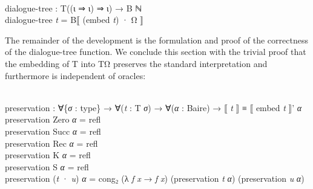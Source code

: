 \documentclass{entcs} \usepackage{prentcsmacro}
\newcommand{\AgdaFontStyle}[1]{\textsf{#1}}
\newcommand{\AgdaBoundFontStyle}[1]{\textit{#1}}
\newcommand{\AgdaSymbol}      [1]{\textcolor{AgdaSymbol}{#1}}
\newcommand{\AgdaBound}    [1]{\AgdaBoundFontStyle{\textcolor{AgdaBound}{#1}}}
\newcommand{\AgdaInductiveConstructor}[1]
    {\AgdaFontStyle{\textcolor{AgdaInductiveConstructor}{#1}}}
\newcommand{\AgdaDatatype} [1]{\AgdaFontStyle{\textcolor{AgdaDatatype}{#1}}}
\newcommand{\AgdaFunction} [1]{\AgdaFontStyle{\textcolor{AgdaFunction}{#1}}}
\newcommand{\AgdaCodeStyle}{\small}
\newenvironment{code}%
{\noindent\AgdaCodeStyle\pboxed}%
{\endpboxed\par\noindent%
\ignorespacesafterend}
\begin{document}
\begin{code}\>\<%
\\
\>\AgdaFunction{dialogue-tree} \AgdaSymbol{:} \AgdaDatatype{T}\AgdaSymbol{((}\AgdaInductiveConstructor{ι} \AgdaInductiveConstructor{⇒} \AgdaInductiveConstructor{ι}\AgdaSymbol{)} \AgdaInductiveConstructor{⇒} \AgdaInductiveConstructor{ι}\AgdaSymbol{)} \AgdaSymbol{→} \AgdaFunction{B} \AgdaDatatype{ℕ}\<%
\\
\>\AgdaFunction{dialogue-tree} \AgdaBound{t} \AgdaSymbol{=} \AgdaFunction{B⟦} \AgdaSymbol{(}\AgdaFunction{embed} \AgdaBound{t}\AgdaSymbol{)} \AgdaInductiveConstructor{·} \AgdaInductiveConstructor{Ω} \AgdaFunction{⟧}\<%
\\
\>\<\end{code}

\noindent
The remainder of the development is the formulation and proof of the
correctness of the dialogue-tree function.  We conclude this section
with the trivial proof that the embedding of T into TΩ preserves the
standard interpretation and furthermore is independent of oracles:

\begin{code}\>\<%
\\
\>\AgdaFunction{preservation} \AgdaSymbol{:} \AgdaSymbol{∀\{}\AgdaBound{σ} \AgdaSymbol{:} \AgdaDatatype{type}\AgdaSymbol{\}} \AgdaSymbol{→} \AgdaSymbol{∀(}\AgdaBound{t} \AgdaSymbol{:} \AgdaDatatype{T} \AgdaBound{σ}\AgdaSymbol{)} \AgdaSymbol{→} \AgdaSymbol{∀(}\AgdaBound{α} \AgdaSymbol{:} \AgdaFunction{Baire}\AgdaSymbol{)} \AgdaSymbol{→} \AgdaFunction{⟦} \AgdaBound{t} \AgdaFunction{⟧} \AgdaDatatype{≡} \AgdaFunction{⟦} \AgdaFunction{embed} \AgdaBound{t} \AgdaFunction{⟧'} \AgdaBound{α}\<%
\\
\>\AgdaFunction{preservation} \AgdaInductiveConstructor{Zero} \AgdaBound{α} \AgdaSymbol{=} \AgdaInductiveConstructor{refl}\<%
\\
\>\AgdaFunction{preservation} \AgdaInductiveConstructor{Succ} \AgdaBound{α} \AgdaSymbol{=} \AgdaInductiveConstructor{refl}\<%
\\
\>\AgdaFunction{preservation} \AgdaInductiveConstructor{Rec} \AgdaBound{α} \AgdaSymbol{=} \AgdaInductiveConstructor{refl}\<%
\\
\>\AgdaFunction{preservation} \AgdaInductiveConstructor{K} \AgdaBound{α} \AgdaSymbol{=} \AgdaInductiveConstructor{refl}\<%
\\
\>\AgdaFunction{preservation} \AgdaInductiveConstructor{S} \AgdaBound{α} \AgdaSymbol{=} \AgdaInductiveConstructor{refl}\<%
\\
\>\AgdaFunction{preservation} \AgdaSymbol{(}\AgdaBound{t} \AgdaInductiveConstructor{·} \AgdaBound{u}\AgdaSymbol{)} \AgdaBound{α} \AgdaSymbol{=} \AgdaFunction{cong₂} \AgdaSymbol{(λ} \AgdaBound{f} \AgdaBound{x} \AgdaSymbol{→} \AgdaBound{f} \AgdaBound{x}\AgdaSymbol{)} \AgdaSymbol{(}\AgdaFunction{preservation} \AgdaBound{t} \AgdaBound{α}\AgdaSymbol{)} \AgdaSymbol{(}\AgdaFunction{preservation} \AgdaBound{u} \AgdaBound{α}\AgdaSymbol{)}\<%
\\
\>\<\end{code}
\end{document}
